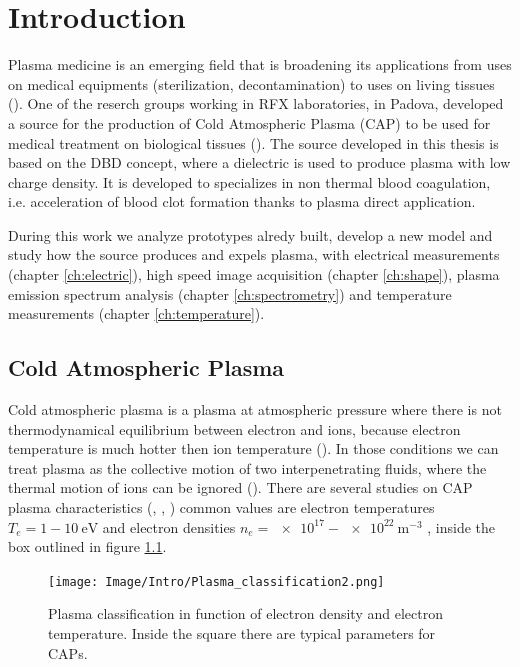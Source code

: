\chapter{Introduction}
\label{ch:intro}
Plasma medicine is an emerging field that is broadening its applications from uses on medical equipments (sterilization, decontamination) to  uses on living tissues (\cite{IntoReview}). One of the reserch groups working in RFX laboratories, in Padova, developed a source for the production of Cold Atmospheric Plasma (CAP) to be used for medical treatment on biological tissues (\cite{DeMasi_2018}). The source developed in this thesis is based on the DBD concept, where a dielectric is used to produce plasma with low charge density. It is developed to specializes in non thermal blood coagulation, i.e. acceleration of blood clot formation thanks to plasma direct application.

During this work we analyze prototypes alredy built, develop a new model and study how the source produces and expels plasma, with electrical measurements (chapter \ref{ch:electric}), high speed image acquisition (chapter \ref{ch:shape}), plasma emission spectrum analysis (chapter \ref{ch:spectrometry}) and temperature measurements (chapter \ref{ch:temperature}).


\section{Cold Atmospheric Plasma}
Cold atmospheric plasma is a plasma at atmospheric pressure where there is not thermodynamical equilibrium between electron and ions, because electron temperature is much hotter then ion temperature (\cite{VONENGEL196599}). In those conditions we can treat plasma as the collective motion of two interpenetrating fluids, where the thermal motion of ions can be ignored (\cite{goossens2012introduction}).
There are several studies on CAP plasma characteristics (\cite{Zhu_2009}, \cite{Ohyama_2009}, \cite{Amorim_2015}) common values are electron temperatures $T_e = 1 - \SI{10}{\electronvolt}$ and electron densities $n_e = \num{e17} - \SI{e22}{\meter^{-3}}$ , inside the box outlined in figure \ref{fig:plasmaclass}. 
\begin{figure}
 \centering
 \texttt{[image: Image/Intro/Plasma\_classification2.png]}
 \caption{Plasma classification in function of electron density and electron temperature. Inside the square there are typical parameters for CAPs.}
 \label{fig:plasmaclass}
\end{figure}


